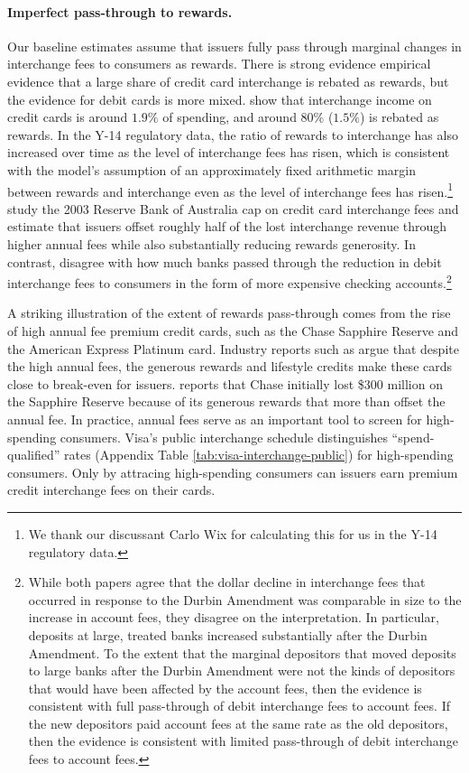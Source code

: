 \documentclass[main.tex]{subfiles}
\begin{document}
\paragraph{Imperfect pass-through to rewards.}
Our baseline estimates assume that issuers fully pass through marginal changes in interchange fees to consumers as rewards.
There is strong evidence empirical evidence that a large share of credit card interchange is rebated as rewards, but the evidence for debit cards is more mixed.
\citet{Drechsler.etal2025} show that interchange income on credit cards is around $1.9\%$ of spending, and around 80\% ($1.5\%$) is rebated as rewards.
In the Y-14 regulatory data, the ratio of rewards to interchange has also increased over time as the level of interchange fees has risen, which is consistent with the model's assumption of an approximately fixed arithmetic margin between rewards and interchange even as the level of interchange fees has risen.\footnote{
    We thank our discussant Carlo Wix for calculating this for us in the Y-14 regulatory data.
}
\citet{Chang.etal2005} study the 2003 Reserve Bank of Australia cap on credit card interchange fees and estimate that issuers offset roughly half of the lost interchange revenue through higher annual fees while also substantially reducing rewards generosity.
In contrast, \citet{Kay.etal2018, Mukharlyamov.Sarin2025} disagree with how much banks passed through the reduction in debit interchange fees to consumers in the form of more expensive checking accounts.\footnote{While both papers agree that the dollar decline in interchange fees that occurred in response to the Durbin Amendment was comparable in size to the increase in account fees, they disagree on the interpretation. In particular, deposits at large, treated banks increased substantially after the Durbin Amendment. To the extent that the marginal depositors that moved deposits to large banks after the Durbin Amendment were not the kinds of depositors that would have been affected by the account fees, then the evidence is consistent with full pass-through of debit interchange fees to account fees. If the new depositors paid account fees at the same rate as the old depositors, then the evidence is consistent with limited pass-through of debit interchange fees to account fees.}

A striking illustration of the extent of rewards pass-through comes from the rise of high annual fee premium credit cards, such as the Chase Sapphire Reserve and the American Express Platinum card.
Industry reports such as \citet{Brown.McDonald2026} argue that despite the high annual fees, the generous rewards and lifestyle credits make these cards close to break-even for issuers.
\citet{Son2018} reports that Chase initially lost \$300 million on the Sapphire Reserve because of its generous rewards that more than offset the annual fee.
In practice, annual fees serve as an important tool to screen for high-spending consumers. 
Visa's public interchange schedule distinguishes ``spend-qualified'' rates (Appendix Table \ref{tab:visa-interchange-public}) for high-spending consumers.
Only by attracing high-spending consumers can issuers earn premium credit interchange fees on their cards.
\end{document}
